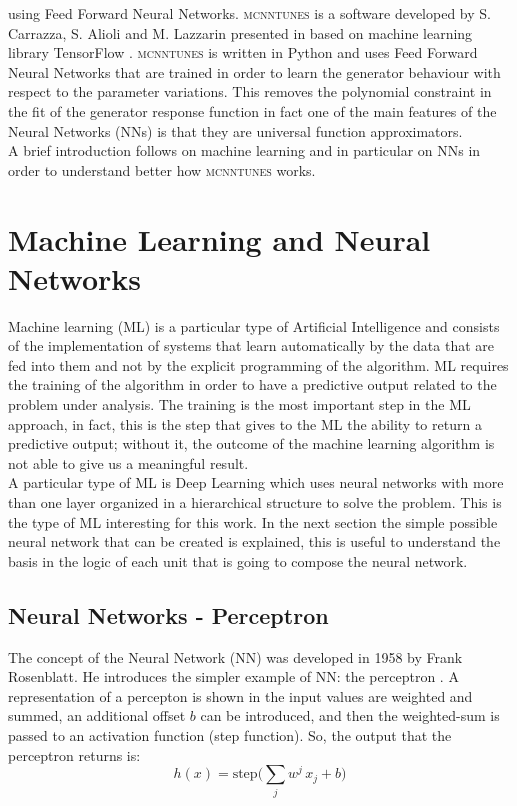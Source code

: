 using Feed Forward Neural Networks. \textsc{mcnntunes} is a software developed by S. Carrazza, S. Alioli and M. Lazzarin presented in \cite{MCNNTUNESarticle} based on machine learning library TensorFlow \cite{tensorflow2015-whitepaper}. \textsc{mcnntunes} is written in Python and uses Feed Forward Neural Networks that are trained in order to learn the generator behaviour with respect to the parameter variations. This removes the polynomial constraint in the fit of the generator response function in fact one of the main features of the Neural Networks (NNs) is that they are universal function approximators.
\\
A brief introduction follows on machine learning and in particular on NNs in order to understand better how \textsc{mcnntunes} works.

\section{Machine Learning and Neural Networks}
  
Machine learning (ML) is a particular type of Artificial Intelligence and consists of the implementation of systems that learn automatically by the data that are fed into them and not by the explicit programming of the algorithm. ML requires the training of the algorithm in order to have a predictive output related to the problem under analysis. The training is the most important step in the ML approach, in fact, this is the step that gives to the ML the ability to return a predictive output; without it, the outcome of the machine learning algorithm is not able to give us a meaningful result.
\\
A particular type of ML is Deep Learning which uses neural networks with more than one layer organized in a hierarchical structure to solve the problem. This is the type of ML interesting for this work. In the next section the simple possible neural network that can be created is explained, this is useful to understand the basis in the logic of each unit that is going to compose the neural network. 


\subsection{Neural Networks - Perceptron}

The concept of the Neural Network (NN) was developed in 1958 by Frank Rosenblatt. He introduces the simpler example of NN: the perceptron \cite{Perceptron}. A representation of a percepton is shown in  the input values are weighted and summed, an additional offset $b$ can be introduced, and then the weighted-sum is passed to an activation function (step function). So, the output that the perceptron returns is:
\begin{equation}
	h(x)= \text{step}\bigg(\displaystyle\sum_j w^j\, x_j + b\bigg)
\end{equation}

